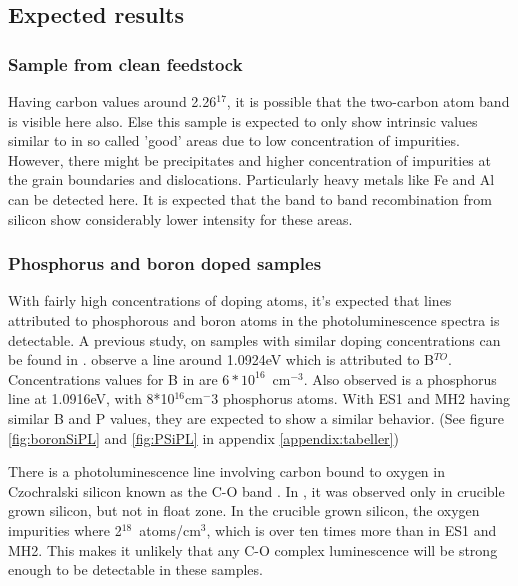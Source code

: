 \subsection{Expected results}


\subsubsection{Sample from clean feedstock}

Having carbon values around 2.26$^{17}$, it is possible that the two-carbon atom band is visible here also. Else this sample is expected to only show intrinsic values similar to \cite{dean67} in so called 'good' areas due to low concentration of impurities. However, there might be precipitates and higher concentration of impurities at the grain boundaries and dislocations. Particularly heavy metals like Fe and Al can be detected here. It is expected that the band to band recombination from silicon show considerably lower intensity for these areas.




\subsubsection{Phosphorus and boron doped samples}

With fairly high concentrations of doping atoms, it's expected that lines attributed to phosphorous and boron atoms in the photoluminescence spectra is detectable. A previous study, on samples with similar doping concentrations can be found in \cite{dean67}. \cite{dean67} observe a line around 1.0924eV which is attributed to B$^{TO}$. Concentrations values for B in \cite{dean67} are $6*10^{16}$~cm$^{-3}$. Also observed is a phosphorus line at 1.0916eV, with 8*10$^{16}$cm$^-3$ phosphorus atoms. With ES1 and MH2 having similar B and P values, they are expected to show a similar behavior. (See figure \ref{fig:boronSiPL} and \ref{fig:PSiPL} in appendix \ref{appendix:tabeller})

There is a photoluminescence line involving carbon bound to oxygen in Czochralski silicon known as the C-O band \cite{davies88}. In \cite{hare72}, it was observed only in crucible grown silicon, but not in float zone. In the crucible grown silicon, the oxygen impurities where 2$^{18}$~atoms/cm$^3$, which is over ten times more than in ES1 and MH2. This makes it unlikely that any C-O complex luminescence will be strong enough to be detectable in these samples.

